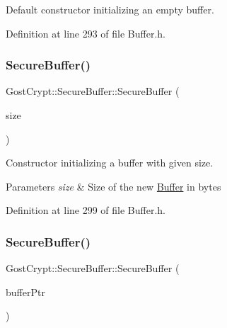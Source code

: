 Default constructor initializing an empty buffer. 



Definition at line 293 of file Buffer.\+h.

\mbox{\label{class_gost_crypt_1_1_secure_buffer_a5e918227d8d7c3acc9e061da822788c0}} 
\subsubsection{\texorpdfstring{Secure\+Buffer()}{SecureBuffer()}\hspace{0.1cm}{\footnotesize\ttfamily [2/3]}}
{\footnotesize\ttfamily Gost\+Crypt\+::\+Secure\+Buffer\+::\+Secure\+Buffer (\begin{DoxyParamCaption}\item[{size\+\_\+t}]{size }\end{DoxyParamCaption})\hspace{0.3cm}{\ttfamily [inline]}}



Constructor initializing a buffer with given size. 


\begin{DoxyParams}{Parameters}
{\em size} & Size of the new \hyperlink{class_gost_crypt_1_1_buffer}{Buffer} in bytes \\
\hline
\end{DoxyParams}


Definition at line 299 of file Buffer.\+h.

\mbox{\label{class_gost_crypt_1_1_secure_buffer_a316949816e1e009ad9a23e48525e74ef}} 
\subsubsection{\texorpdfstring{Secure\+Buffer()}{SecureBuffer()}\hspace{0.1cm}{\footnotesize\ttfamily [3/3]}}
{\footnotesize\ttfamily Gost\+Crypt\+::\+Secure\+Buffer\+::\+Secure\+Buffer (\begin{DoxyParamCaption}\item[{const \hyperlink{class_gost_crypt_1_1_buffer_ptr}{Buffer\+Ptr} \&}]{buffer\+Ptr }\end{DoxyParamCaption})\hspace{0.3cm}{\ttfamily [inline]}}



